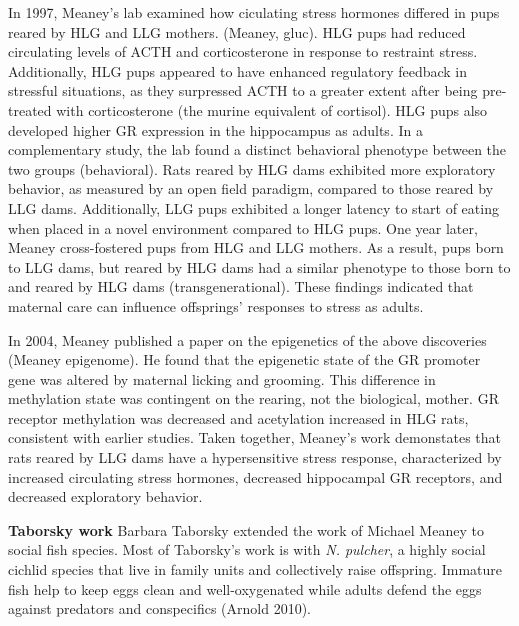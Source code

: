 \documentclass[12pt,twoside]{reedthesis}
\begin{document}
In 1997, Meaney's lab examined how ciculating stress hormones differed in pups
reared by HLG and LLG mothers. (Meaney, gluc). HLG pups had reduced circulating levels of ACTH and
corticosterone in response to restraint stress. Additionally, HLG pups appeared
to have enhanced regulatory feedback in stressful situations, as they surpressed
ACTH to a greater extent after being pre-treated with corticosterone (the murine
equivalent of cortisol). HLG pups
also developed higher GR expression in the hippocampus as adults. In a
complementary study, the lab found a distinct behavioral phenotype between the
two groups (behavioral). Rats reared by HLG dams exhibited more exploratory
behavior, as measured by an open field paradigm, compared to those reared by LLG
dams. Additionally, LLG pups exhibited a longer latency to start of eating when
placed in a novel environment compared to HLG pups. One year later, Meaney cross-fostered pups from HLG and
LLG mothers. As a result, pups born to LLG dams, but reared by HLG dams had a
similar phenotype to those born to and reared by HLG dams (transgenerational). These findings
indicated that maternal care can influence offsprings' responses to stress as
adults.

In 2004, Meaney
published a paper on the epigenetics of the above discoveries (Meaney epigenome). He found that the
epigenetic state of the GR promoter gene was altered by maternal licking and
grooming. This difference in methylation state was contingent on the rearing,
not the biological, mother.  GR receptor methylation was decreased and
acetylation increased in HLG rats, consistent with earlier studies. Taken
together, Meaney's work demonstates that rats reared by LLG dams have a
hypersensitive stress response, characterized by increased circulating stress
hormones, decreased hippocampal GR receptors, and decreased exploratory
behavior. 

\textbf{Taborsky work}
Barbara Taborsky extended the work of Michael Meaney to social fish species.
Most of Taborsky's work is with \textit{N. pulcher}, a highly social cichlid species
that live in family units and collectively raise offspring. Immature fish help
to keep eggs clean and well-oxygenated while adults defend the eggs against
predators and conspecifics (Arnold 2010).
\end{document}
